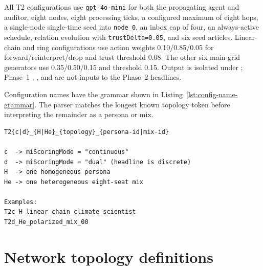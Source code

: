 All T2 configurations use \texttt{gpt-4o-mini} for both the propagating agent
and auditor, eight nodes, eight processing ticks, a configured maximum of
eight hops, a single-node single-time seed into \texttt{node\_0}, an inbox cap
of four, an always-active schedule, relation evolution with
\texttt{trustDelta=0.05}, and six seed articles. Linear-chain and ring
configurations use action weights 0.10/0.85/0.05 for
forward/reinterpret/drop and trust threshold 0.08. The other six main-grid
generators use 0.35/0.50/0.15 and threshold 0.15.
Output is isolated under ; Phase~1
, , and  are not inputs to
the Phase~2 headlines.

Configuration names have the grammar shown in
Listing~\ref{lst:config-name-grammar}.  The parser matches the longest known
topology token before interpreting the remainder as a persona or mix.

\begin{lstlisting}[basicstyle=\ttfamily\small,breaklines=true,
  caption={Phase~2 configuration-name grammar.},
  label={lst:config-name-grammar}]
T2{c|d}_{H|He}_{topology}_{persona-id|mix-id}

c  -> miScoringMode = "continuous"
d  -> miScoringMode = "dual" (headline is discrete)
H  -> one homogeneous persona
He -> one heterogeneous eight-seat mix

Examples:
T2c_H_linear_chain_climate_scientist
T2d_He_polarized_mix_00
\end{lstlisting}

\section{Network topology definitions}
\label{app:topologies}


